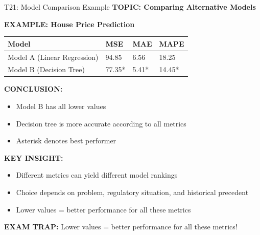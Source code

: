 \documentclass[8pt]{beamer}
\begin{document}
	\begin{frame}{T21: Model Comparison Example}
		\fontsize{6.5}{7.5}\selectfont
		\textbf{TOPIC: Comparing Alternative Models}
		
		\vspace{0.1cm}
		\textbf{EXAMPLE: House Price Prediction}
		
		\begin{tabular}{|p{3.5cm}|p{2.5cm}|p{2.5cm}|p{2.5cm}|}
			\hline
			\textbf{Model} & \textbf{MSE} & \textbf{MAE} & \textbf{MAPE} \\
			\hline
			Model A (Linear Regression) & 94.85 & 6.56 & 18.25 \\
			\hline
			Model B (Decision Tree) & 77.35* & 5.41* & 14.45* \\
			\hline
		\end{tabular}
		
		\vspace{0.1cm}
		\textbf{CONCLUSION:}
		\begin{itemize}
			\item Model B has all lower values
			\item Decision tree is more accurate according to all metrics
			\item Asterisk denotes best performer
		\end{itemize}
		
		\vspace{0.1cm}
		\textbf{KEY INSIGHT:}
		\begin{itemize}
			\item Different metrics can yield different model rankings
			\item Choice depends on problem, regulatory situation, and historical precedent
			\item Lower values = better performance for all these metrics
		\end{itemize}
		
		\textcolor{myred}{\textbf{EXAM TRAP:}} Lower values = \textcolor{myblue}{better performance} for all these metrics!
	\end{frame}
	
\end{document}
